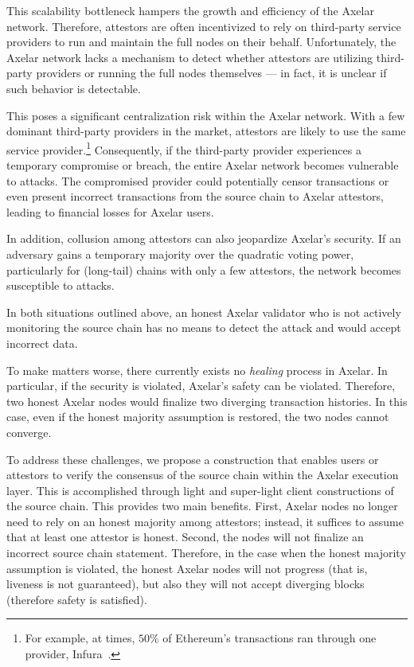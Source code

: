 This scalability bottleneck hampers the growth and efficiency of the Axelar network. Therefore, attestors are often incentivized to rely on third-party service providers to run and maintain the full nodes on their behalf. Unfortunately, the Axelar network lacks a mechanism to detect whether attestors are utilizing third-party providers or running the full nodes themselves --- in fact, it is unclear if such behavior is detectable.

This poses a significant centralization risk within the Axelar network. With a few dominant third-party providers in the market, attestors are likely to use the same service provider.\footnote{For example, at times, $50$\% of Ethereum's transactions ran through one provider, Infura~\cite{infura}.} Consequently, if the third-party provider experiences a temporary compromise or breach, the entire Axelar network becomes vulnerable to attacks. The compromised provider could potentially censor transactions or even present incorrect transactions from the source chain to Axelar attestors, leading to financial losses for Axelar users.

In addition, collusion among attestors can also jeopardize Axelar's security. If an adversary gains a temporary majority over the quadratic voting power, particularly for (long-tail) chains with only a few attestors, the network becomes susceptible to attacks.

In both situations outlined above, an honest Axelar validator who is not actively monitoring the source chain has no means to detect the attack and would accept incorrect data.

To make matters worse, there currently exists no \emph{healing} process in Axelar. In particular, if the security is violated, Axelar's safety can be violated. Therefore, two honest Axelar nodes would finalize two diverging transaction histories. In this case, even if the honest majority assumption is restored, the two nodes cannot converge.

To address these challenges, we propose a construction that enables users or attestors to verify the consensus of the source chain within the Axelar execution layer. This is accomplished through light and super-light client constructions of the source chain. This provides two main benefits. First, Axelar nodes no longer need to rely on an honest majority among attestors; instead, it suffices to assume that at least one attestor is honest. Second, the nodes will not finalize an incorrect source chain statement. Therefore, in the case when the honest majority assumption is violated, the honest Axelar nodes will not progress (that is, liveness is not guaranteed), but also they will not accept diverging blocks (therefore safety is satisfied).

